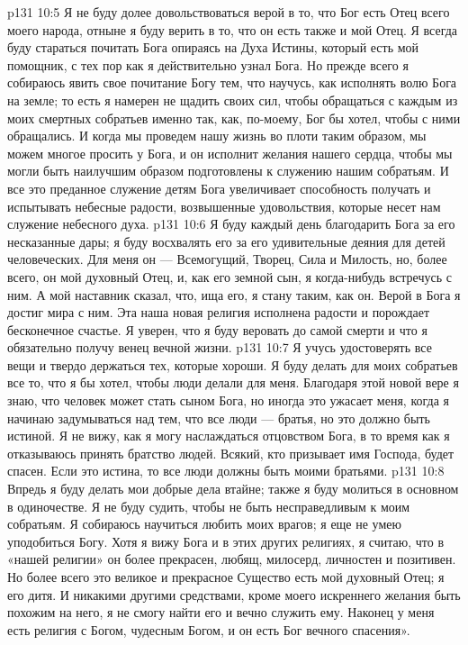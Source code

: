 \vs p131 10:5 Я не буду долее довольствоваться верой в то, что Бог есть Отец всего моего народа, отныне я буду верить в то, что он есть также и мой Отец. Я всегда буду стараться почитать Бога опираясь на Духа Истины, который есть мой помощник, с тех пор как я действительно узнал Бога. Но прежде всего я собираюсь явить свое почитание Богу тем, что научусь, как исполнять волю Бога на земле; то есть я намерен не щадить своих сил, чтобы обращаться с каждым из моих смертных собратьев именно так, как, по\hyp{}моему, Бог бы хотел, чтобы с ними обращались. И когда мы проведем нашу жизнь во плоти таким образом, мы можем многое просить у Бога, и он исполнит желания нашего сердца, чтобы мы могли быть наилучшим образом подготовлены к служению нашим собратьям. И все это преданное служение детям Бога увеличивает способность получать и испытывать небесные радости, возвышенные удовольствия, которые несет нам служение небесного духа.
\vs p131 10:6 Я буду каждый день благодарить Бога за его несказанные дары; я буду восхвалять его за его удивительные деяния для детей человеческих. Для меня он --- Всемогущий, Творец, Сила и Милость, но, более всего, он мой духовный Отец, и, как его земной сын, я когда\hyp{}нибудь встречусь с ним. А мой наставник сказал, что, ища его, я стану таким, как он. Верой в Бога я достиг мира с ним. Эта наша новая религия исполнена радости и порождает бесконечное счастье. Я уверен, что я буду веровать до самой смерти и что я обязательно получу венец вечной жизни.
\vs p131 10:7 Я учусь удостоверять все вещи и твердо держаться тех, которые хороши. Я буду делать для моих собратьев все то, что я бы хотел, чтобы люди делали для меня. Благодаря этой новой вере я знаю, что человек может стать сыном Бога, но иногда это ужасает меня, когда я начинаю задумываться над тем, что все люди --- братья, но это должно быть истиной. Я не вижу, как я могу наслаждаться отцовством Бога, в то время как я отказываюсь принять братство людей. Всякий, кто призывает имя Господа, будет спасен. Если это истина, то все люди должны быть моими братьями.
\vs p131 10:8 Впредь я буду делать мои добрые дела втайне; также я буду молиться в основном в одиночестве. Я не буду судить, чтобы не быть несправедливым к моим собратьям. Я собираюсь научиться любить моих врагов; я еще не умею уподобиться Богу. Хотя я вижу Бога и в этих других религиях, я считаю, что в «нашей религии» он более прекрасен, любящ, милосерд, личностен и позитивен. Но более всего это великое и прекрасное Существо есть мой духовный Отец; я его дитя. И никакими другими средствами, кроме моего искреннего желания быть похожим на него, я не смогу найти его и вечно служить ему. Наконец у меня есть религия с Богом, чудесным Богом, и он есть Бог вечного спасения».
